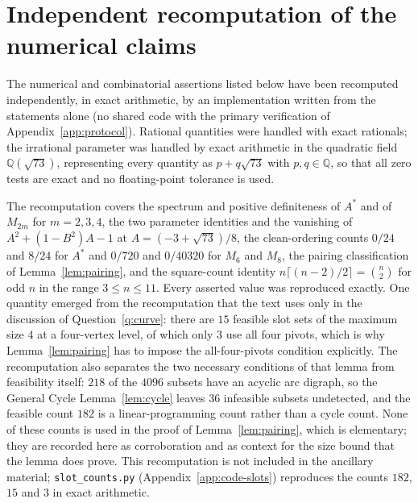 \documentclass[11pt]{article}
\theoremstyle{plain}
\theoremstyle{definition}
\theoremstyle{remark}
\begin{document}
\section{Independent recomputation of the numerical claims}\label{app:recheck}
\begin{humanblock}
The numerical and combinatorial assertions listed below have been recomputed
independently, in exact arithmetic, by an implementation written from the
statements alone (no shared code with the primary verification of
Appendix~\ref{app:protocol}). Rational quantities were handled with exact
rationals; the irrational parameter was handled by exact arithmetic in the
quadratic field $\mathbb{Q}(\sqrt{73})$, representing every quantity as
$p+q\sqrt{73}$ with $p,q\in\mathbb{Q}$, so that all zero tests are exact and no
floating-point tolerance is used.

The recomputation covers the spectrum and positive definiteness of $A^*$ and of $M_{2m}$ for
$m=2,3,4$, the two parameter identities and the vanishing of $A^2+(1-B^2)A-1$ at
$A=(-3+\sqrt{73})/8$, the clean-ordering counts $0/24$ and $8/24$ for $A^*$ and $0/720$ and $0/40320$
for $M_6$ and $M_8$, the pairing classification of Lemma~\ref{lem:pairing}, and the square-count identity
$n\lceil(n-2)/2\rceil=\binom{n}{2}$ for odd $n$ in the range $3\le n\le11$. Every asserted value was
reproduced exactly. One quantity emerged from the recomputation that the text uses only in the
discussion of Question~\ref{q:curve}: there are
$15$ feasible slot sets of the maximum size $4$ at a four-vertex level, of which only $3$ use all four
pivots, which is why Lemma~\ref{lem:pairing} has to impose the all-four-pivots condition explicitly.
The recomputation also separates the two necessary conditions of that lemma from feasibility
itself: $218$ of the $4096$ subsets have an acyclic arc digraph, so the General Cycle
Lemma~\ref{lem:cycle} leaves $36$ infeasible subsets undetected, and the feasible count $182$ is a
linear-programming count rather than a cycle count. None of these counts is used in
the proof of Lemma~\ref{lem:pairing}, which is elementary; they are recorded here as
corroboration and as context for the size bound that the lemma does prove. This recomputation is
not included in the ancillary material; \texttt{slot\_counts.py} (Appendix~\ref{app:code-slots})
reproduces the counts $182$, $15$ and $3$ in exact arithmetic.


\end{humanblock}
\end{document}
